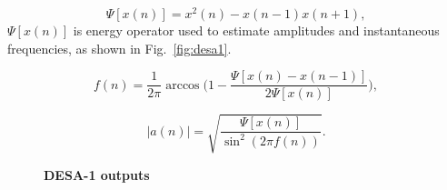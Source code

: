 {\begin{equation}
\Psi [x(n)] = x^2(n)-x(n-1)x(n+1),
\end{equation}
$\Psi [x(n)]$ is energy operator used to estimate amplitudes and instantaneous frequencies, as shown in Fig.~\ref{fig:desa1}. 


\begin{equation}
\label{eq:instfreq}
f(n) = \frac{1}{2\pi}\arccos \Big (1-\frac{\Psi[x(n)-x(n-1)]}{2\Psi[x(n)]}\Big),
\end{equation}
 
 
\begin{equation}
\label{eq:instamp}
|a(n)| = \sqrt{\frac{\Psi[x(n)]}{\sin^2(2\pi f(n))}}.
\end{equation}


\begin{figure}[!t]
	\vspace{2mm}
	\centering
	\textbf{DESA-1 outputs}\par\medskip    
	\begin{subfigure}[b]{3.5in}
	\end{subfigure}
	\\
	\vspace{1.0mm}
	\begin{subfigure}[b]{3.5in}
	\end{subfigure}
	\\
	\vspace{1.0mm}
	\hspace{0.1mm}
	\begin{subfigure}[b]{3.5in}

\end{subfigure}
\end{figure}}
